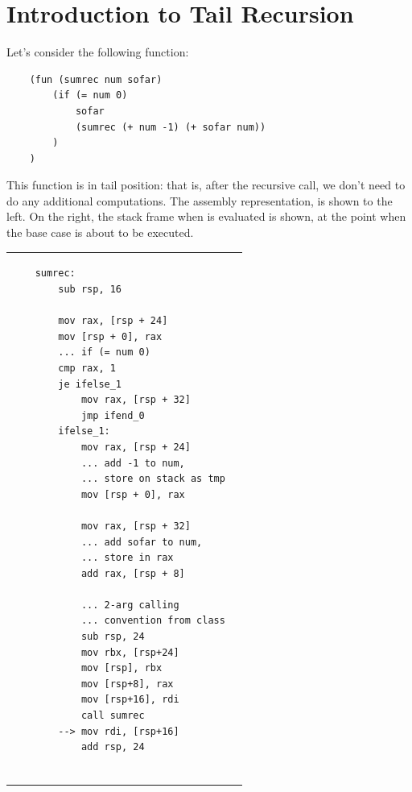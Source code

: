 \section{Introduction to Tail Recursion}
Let's consider the following function:
\begin{verbatim}
    (fun (sumrec num sofar)
        (if (= num 0)
            sofar 
            (sumrec (+ num -1) (+ sofar num))
        )
    )\end{verbatim}
This function is in tail position: that is, after the recursive call, we don't need to do any additional computations. The assembly representation, is shown to the left. On the right, the stack frame when  is evaluated is shown, at the point when the base case is about to be executed. 
\begin{center}
    \begin{tabular}{p{3in} p{3in}}
        \begin{verbatim}
    sumrec:
        sub rsp, 16
        
        mov rax, [rsp + 24]
        mov [rsp + 0], rax
        ... if (= num 0)  
        cmp rax, 1
        je ifelse_1
            mov rax, [rsp + 32]
            jmp ifend_0
        ifelse_1:
            mov rax, [rsp + 24]
            ... add -1 to num, 
            ... store on stack as tmp
            mov [rsp + 0], rax
    
            mov rax, [rsp + 32]
            ... add sofar to num, 
            ... store in rax
            add rax, [rsp + 8]
      
            ... 2-arg calling 
            ... convention from class
            sub rsp, 24
            mov rbx, [rsp+24]
            mov [rsp], rbx
            mov [rsp+8], rax
            mov [rsp+16], rdi
            call sumrec 
        --> mov rdi, [rsp+16]
            add rsp, 24 
        

\end{verbatim}
\end{tabular}
\end{center}
